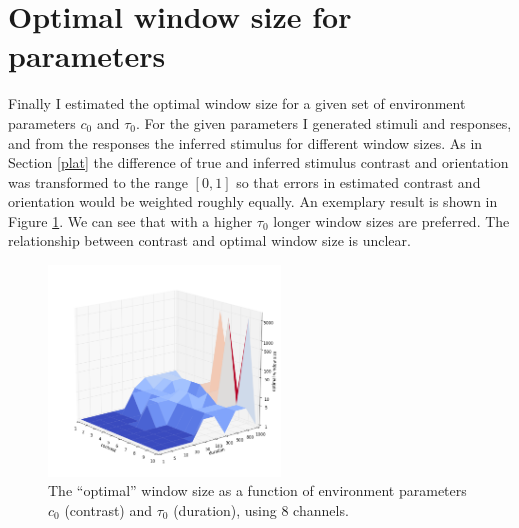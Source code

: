 \documentclass{scrartcl}
\begin{document}
\section{Optimal window size for parameters}

Finally I estimated the optimal window size for a given set of environment parameters $c_0$ and $\tau_0$. For the given parameters I generated stimuli and responses, and from the responses the inferred stimulus for different window sizes. As in Section \ref{plat} the difference of true and inferred stimulus contrast and orientation was transformed to the range $\left[0, 1\right]$ so that errors in estimated contrast and orientation would be weighted roughly equally. An exemplary result is shown in Figure \ref{optws}. We can see that with a higher $\tau_0$ longer window sizes are preferred. The relationship between contrast and optimal window size is unclear.

\begin{figure}[h]
\centering
\includegraphics[width=0.55\textwidth, clip]{../pics/optws_chan8}
\caption{The ``optimal'' window size as a function of environment parameters $c_0$ (contrast) and $\tau_0$ (duration), using 8 channels.}
\label{optws}
\end{figure}
\end{document}
